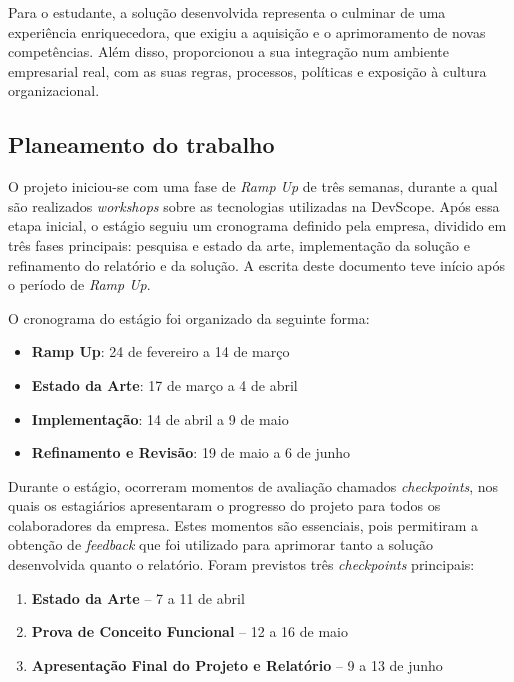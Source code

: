 Para o estudante, a solução desenvolvida representa o culminar de uma experiência enriquecedora, que exigiu a aquisição e o aprimoramento de novas competências. Além disso, proporcionou a sua integração num ambiente empresarial real, com as suas regras, processos, políticas e exposição à cultura organizacional.

\subsection{Planeamento do trabalho}  

O projeto iniciou-se com uma fase de \textit{Ramp Up} de três semanas, durante a qual são realizados \textit{workshops} sobre as tecnologias utilizadas na DevScope. Após essa etapa inicial, o estágio seguiu um cronograma definido pela empresa, dividido em três fases principais: pesquisa e estado da arte, implementação da solução e refinamento do relatório e da solução. A escrita deste documento teve início após o período de \textit{Ramp Up}.

O cronograma do estágio foi organizado da seguinte forma:

\begin{itemize}
    \item \textbf{Ramp Up}: 24 de fevereiro a 14 de março
    \item \textbf{Estado da Arte}: 17 de março a 4 de abril
    \item \textbf{Implementação}: 14 de abril a 9 de maio
    \item \textbf{Refinamento e Revisão}: 19 de maio a 6 de junho
\end{itemize}

Durante o estágio, ocorreram momentos de avaliação chamados \textit{checkpoints}, nos quais os estagiários apresentaram o progresso do projeto para todos os colaboradores da empresa. Estes momentos são essenciais, pois permitiram a obtenção de \textit{feedback} que foi utilizado para aprimorar tanto a solução desenvolvida quanto o relatório. Foram previstos três \textit{checkpoints} principais:

\begin{enumerate}
    \item \textbf{Estado da Arte} – 7 a 11 de abril
    \item \textbf{Prova de Conceito Funcional} – 12 a 16 de maio
    \item \textbf{Apresentação Final do Projeto e Relatório} – 9 a 13 de junho
\end{enumerate}

